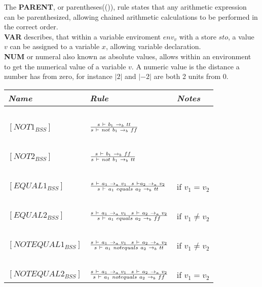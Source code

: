 The \textbf{PARENT}, or parentheses(()), rule states that any arithmetic expression can be parenthesized, allowing chained arithmetic calculations to be performed in the correct order. \\\textbf{VAR} describes, that within a variable enviroment $env_{v}$ with a store $sto$, a value $v$ can be assigned to a variable $x$, allowing variable declaration.
\\\textbf{NUM} or numeral also known as absolute values, allows within an environment to get the numerical value of a variable $v$. A numeric value is the distance a number has from zero, for instance $|2|$ and $|-2|$ are both 2 units from 0.  \\

\begin{table}[H]
	\begin{tabular}{|l|l|l|}
	\hline
	\emph{Name}			& \emph{Rule}																															& \emph{Notes} \\ \hline
			~			&															~																			& ~ \\
	$[NOT1_{BSS}]$		& $s~\vdash~b_{1}~\rightarrow_{b}~tt \over s~\vdash~not~b_{1}~\rightarrow_{b}~ff$														& ~ \\
			~			&															~																			& ~ \\
	$[NOT2_{BSS}]$		& $s~\vdash~b_{1}~\rightarrow_{b}~ff \over s~\vdash~not~b_{1}~\rightarrow_{b}~tt$														& ~ \\
			~			&															~																			& ~ \\
	$[EQUAL1_{BSS}]$	& $s~\vdash~a_{1}~\rightarrow_{a}~v_{1}~~s~\vdash a_{2}~\rightarrow_{a}~v_{2} \over s~\vdash~a_{1}~equals~a_{2}~\rightarrow_{b}~tt$		& if $v_{1} = v_{2}$ \\
			~			&															~																			& ~ \\
	$[EQUAL2_{BSS}]$	& $s~\vdash~a_{1}~\rightarrow_{a}~v_{1}~~s~\vdash~a_{2}~
	\rightarrow_{a}~v_{2} \over s~\vdash~a_{1}~equals~a_{2}~\rightarrow_{b}~ff$		& if $v_{1} \ne v_{2}$ \\
			~			&															~																			& ~ \\
	$[NOTEQUAL1_{BSS}]$	& $s~\vdash~a_{1}~\rightarrow_{a}~v_{1}~~s~\vdash~a_{2}~
	\rightarrow_{a}~v_{2} \over s~\vdash~a_{1}~notequals~a_{2}~\rightarrow_{b}~tt$	& if $v_{1}\ne v_{2}$ \\
			~			&															~																			& ~ \\
	$[NOTEQUAL2_{BSS}]$	& $s~\vdash~a_{1}~\rightarrow_{a}~v_{1}~~s~
	\vdash~a_{2}~\rightarrow_{a}~v_{2} \over s~\vdash~a_{1}~notequals~a_{2}~\rightarrow_{b}~ff$	& if $v_{1} = v_{2}$ \\

\end{tabular}
\end{table}
